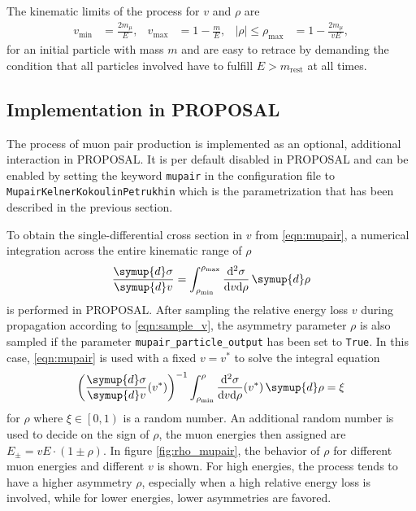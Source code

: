 The kinematic limits of the process for $v$ and $\rho$ are
%
\begin{align}
    v_\text{min} &= \frac{2 m_{\mu}}{E}, & v_\text{max} &= 1 - \frac{m}{E}, & \left| \rho \right| \leq \rho_{\text{max}} &= 1 - \frac{2 m_{\mu}}{v E},
\end{align}
%
for an initial particle with mass $m$ and are easy to retrace by demanding the condition that all particles involved have to fulfill $E > m_{\text{rest}}$ at all times.

\subsection{Implementation in PROPOSAL}
\label{sec:mupair_implementation}

\begin{sloppypar}
The process of muon pair production is implemented as an optional, additional interaction in PROPOSAL.
It is per default disabled in PROPOSAL and can be enabled by setting the keyword \texttt{mupair} in the configuration file to \texttt{MupairKelnerKokoulinPetrukhin} which is the parametrization that has been described in the previous section.
\end{sloppypar}

\begin{sloppypar}
To obtain the single-differential cross section in $v$ from \eqref{eqn:mupair}, a numerical integration across the entire kinematic range of $\rho$
%
\begin{equation}
    \frac{\symup{d}\sigma}{\symup{d}v} = \int_{\rho_{\text{min}}}^{\rho_{\text{max}}} \frac{\mathrm{d}^2\sigma}{\mathrm{d}v \mathrm{d}\rho} \, \symup{d}\rho
\end{equation}
%
is performed in PROPOSAL.
After sampling the relative energy loss $v$ during propagation according to \eqref{eqn:sample_v}, the asymmetry parameter $\rho$ is also sampled if the parameter \texttt{mupair\_particle\_output} has been set to \texttt{True}.
In this case, \eqref{eqn:mupair} is used with a fixed $v = v^{\ast}$ to solve the integral equation
\begin{equation}
    \left( \frac{\symup{d}\sigma}{\symup{d}v}(v^{\ast}) \right)^{-1} \int_{\rho_\text{min}}^{\rho} \frac{\mathrm{d}^2\sigma}{\mathrm{d}v \mathrm{d}\rho}(v^{\ast}) \, \symup{d}\rho = \xi
\end{equation}
for $\rho$ where $\xi \in \left[0,1\right)$ is a random number.
An additional random number is used to decide on the sign of $\rho$, the muon energies then assigned are $E_{\pm} = v E \cdot(1 \pm \rho)$.
In figure \ref{fig:rho_mupair}, the behavior of $\rho$ for different muon energies and different $v$ is shown.
For high energies, the process tends to have a higher asymmetry $\rho$, especially when a high relative energy loss is involved, while for lower energies, lower asymmetries are favored.
\end{sloppypar}

